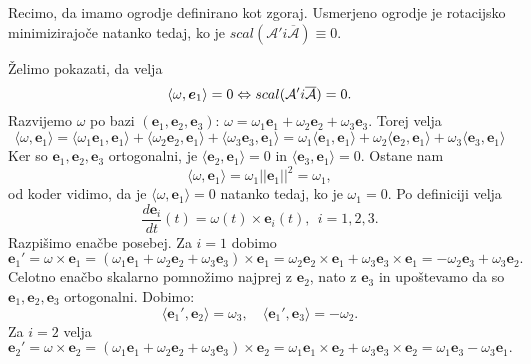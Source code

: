 \documentclass[mat1]{fmfdelo}
\newcommand{\e}{\boldsymbol e}
\newcommand{\A}{\mathcal A}
\begin{document}
\begin{trditev}{\label{rot_min}} Recimo, da imamo ogrodje definirano kot zgoraj.
	Usmerjeno ogrodje je rotacijsko minimizirajoče natanko tedaj, ko je $scal(\A' i\overline{\A})\equiv0$.
\end{trditev}
\begin{dokaz}
Želimo pokazati, da velja
\begin{equation}
\langle \omega,\e_1\rangle = 0 \Leftrightarrow scal(\A' \\i\overline{\A}) = 0.
\end{equation}
Razvijemo $\omega$ po bazi $\left(\e_1,\e_2,\e_3\right)$: $\omega = \omega_1\e_1+\omega_2\e_2+\omega_3\e_3$. Torej velja
\begin{equation*}
\langle \omega, \e_1 \rangle = \langle \omega_1\e_1,\e_1\rangle + \langle \omega_2\e_2,\e_1\rangle + \langle \omega_3\e_3,\e_1\rangle= \omega_1\langle \e_1,\e_1\rangle + \omega_2\langle \e_2,\e_1\rangle + \omega_3\langle \e_3,\e_1\rangle
\end{equation*}
Ker so $\e_1,\e_2,\e_3$ ortogonalni, je  $\langle \e_2,\e_1\rangle = 0$ in $\langle \e_3,\e_1\rangle=0$.
Ostane nam
\begin{equation*}
\langle \omega,\e_1 \rangle =\omega_1 || \e_1 ||^2 = \omega_1,
\end{equation*}
od koder vidimo, da je $\langle \omega, \e_1\rangle = 0$ natanko tedaj, ko je $\omega_1 = 0$.
Po definiciji velja
\begin{equation*}
\frac{d\e_i}{dt}(t) = \omega(t) \times \e_i(t), ~~ i=1,2,3.
\end{equation*}
Razpišimo enačbe posebej. Za $i=1$ dobimo
\begin{equation*}
\e_1' = \omega \times \e_1 = (\omega_1 \e_1 + \omega_2 \e_2 + \omega_3 \e_3) \times \e_1
= \omega_2 \e_2 \times \e_1 + \omega_3 \e_3 \times \e_1 = - \omega_2\e_3 + \omega_3\e_2.
\end{equation*}
Celotno enačbo skalarno pomnožimo najprej z $\e_2$, nato z $\e_3$ in upoštevamo da so $\e_1,\e_2,\e_3$ ortogonalni. Dobimo:
\begin{equation*}
\langle \e_1', \e_2 \rangle  = \omega_3, \quad
\langle \e_1', \e_3 \rangle = -\omega_2.
\end{equation*}
Za $i=2$ velja
\begin{equation*}
\e_2' = \omega \times \e_2 = (\omega_1 \e_1 + \omega_2 \e_2 + \omega_3 \e_3) \times \e_2 =
\omega_1 \e_1 \times \e_2 + \omega_3 \e_3 \times \e_2
=\omega_1\e_3 -\omega_3\e_1.
\end{equation*}

\end{dokaz}
\end{document}
